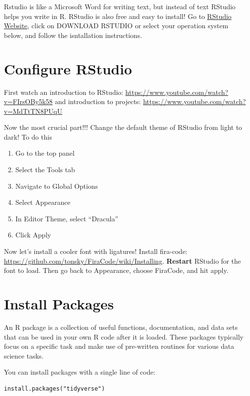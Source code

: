 \documentclass[
  letterpaper,
]{book}
\providecommand{\tightlist}{%
  \setlength{\itemsep}{0pt}\setlength{\parskip}{0pt}}\usepackage{longtable,booktabs,array}
\begin{document}
Rstudio is like a Microsoft Word for writing text, but instead of text
RStudio helps you write in R. RStudio is also free and easy to install!
Go to \href{https://posit.co/download/rstudio-desktop/}{RStudio
Website}, click on DOWNLOAD RSTUDIO or select your operation system
below, and follow the isntallation instructions.

\hypertarget{configure-rstudio}{%
\section{Configure RStudio}\label{configure-rstudio}}

First watch an introduction to RStudio:
\url{https://www.youtube.com/watch?v=FIrsOBy5k58} and introduction to
projects: \url{https://www.youtube.com/watch?v=MdTtTN8PUqU}

Now the most crucial part!!! Change the default theme of RStudio from
light to dark! To do this

\begin{enumerate}
\def\labelenumi{\arabic{enumi}.}
\tightlist
\item
  Go to the top panel
\item
  Select the Tools tab
\item
  Navigate to Global Options
\item
  Select Appearance
\item
  In Editor Theme, select ``Dracula''
\item
  Click Apply
\end{enumerate}

Now let's install a cooler font with ligatures! Install fira-code:
\url{https://github.com/tonsky/FiraCode/wiki/Installing}.
\textbf{Restart} RStudio for the font to load. Then go back to
Appearance, choose FiraCode, and hit apply.

\hypertarget{install-packages}{%
\section{Install Packages}\label{install-packages}}

An R package is a collection of useful functions, documentation, and
data sets that can be used in your own R code after it is loaded. These
packages typically focus on a specific task and make use of pre-written
routines for various data science tasks.

You can install packages with a single line of code:

\begin{verbatim}
install.packages("tidyverse")
\end{verbatim}
\end{document}
